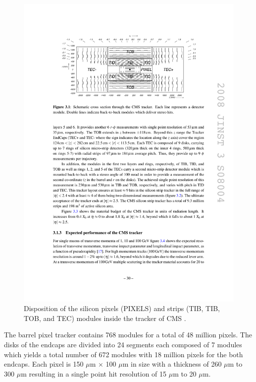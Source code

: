     \begin{figure}[h!]
      \centering
      \includegraphics[width=\textwidth]{img/I-3-cms/tracker.pdf}
      \caption{Disposition of the silicon pixels (PIXELS) and strips (TIB, TIB, TOB, and TEC) modules inside the tracker of CMS \cite{1748-0221-3-08-S08004}.}
      \label{fig:I-3-tracker}
    \end{figure}

    The barrel pixel tracker contains 768 modules for a total of 48 million pixels. The disks of the endcaps are divided into 24 segments each composed of 7 modules which yields a total number of 672 modules with 18 million pixels for the both endcaps. Each pixel is 150 $\mu$m $\times$ 100 $\mu$m in size with a thickness of 260 $\mu$m to 300 $\mu$m resulting in a single point hit resolution of 15 $\mu$m to 20 $\mu$m. \\

